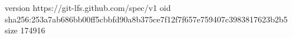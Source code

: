 version https://git-lfs.github.com/spec/v1
oid sha256:253a7ab686bb00ff5cbbfd90a8b375ce7f12f7f657e759407c3983817623b2b5
size 174916
